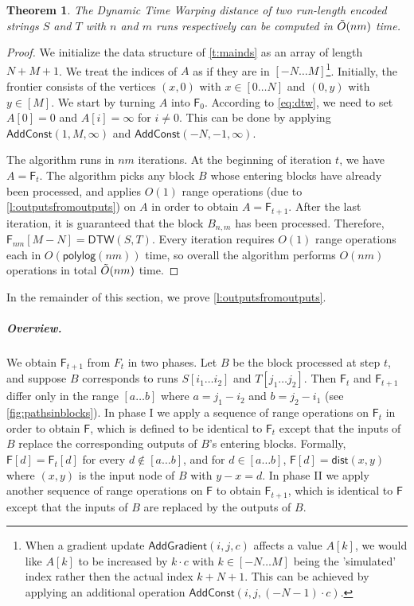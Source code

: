 \documentclass[10pt,a4paper]{article}
\newtheorem{theorem}{Theorem}[section]
\newcommand{\DTW}{\mathsf{DTW}}
\newcommand{\F}{\mathsf{F}}
\newcommand{\AC}{\mathsf{AddConst}}
\newcommand{\AG}{\mathsf{AddGradient}}
\newcommand{\dist}{\mathsf{dist}}
\newcommand{\para}[1]{\vspace{-0.1in} \subparagraph*{#1}}
\newcommand{\polylog}{\mathsf{polylog}}
\begin{document}
\begin{theorem}\label{t:maindtw}
The Dynamic Time Warping distance of two run-length encoded strings $S$ and $T$ with $n$ and $m$ runs respectively can be computed in $\Tilde{O}(nm)$ time.
\end{theorem}

\begin{proof}
We initialize the data structure of \cref{t:mainds} as an array of length $N+M+1$. 
We treat the indices of $A$ as if they are in $[-N \ldots M]$\footnote{When a gradient update $\AG(i,j,c)$ affects a value $A[k]$, we would like $A[k]$ to be increased by $k\cdot c$ with $k \in [-N \ldots M]$ being the 'simulated' index rather then the actual index $k+ N + 1$. This can be achieved by applying an additional operation $\AC(i,j, (-N-1) \cdot c)$.}.
Initially, the frontier consists of the vertices $(x,0)$ with $x\in [0 \ldots N]$ and $(0,y)$ with $y\in [M]$.
We start by turning $A$ into $\F_0$.
According to \cref{eq:dtw}, we need to set $A[0] = 0$ and $A[i] = \infty$ for $i\neq 0$.
This can be done by applying $\AC(1,M, \infty)$ and $\AC(-N,-1,\infty)$. 

The algorithm runs in $nm$ iterations.
At the beginning of iteration $t$, we have $A = \F_t$.
The algorithm picks any block $B$ whose entering blocks have already been processed, and applies $O(1)$ range operations (due to \cref{l:outputsfromoutputs}) on $A$ in order to obtain $A = \F_{t+1}$.
After the last iteration, it is guaranteed that the block $B_{n,m}$ has been processed. 
Therefore, $\F_{nm}[M-N]=\DTW(S,T)$.
Every iteration requires $O(1)$ range operations each in $O(\polylog(nm))$ time, so overall the algorithm performs $O(nm)$ operations in total $\Tilde{O}(nm)$ time.
\end{proof}



In the remainder of this section, we prove \cref{l:outputsfromoutputs}.        

\para{Overview.}
We obtain $\F_{t+1}$ from $F_{t}$ in two phases. Let $B$ be the block processed at step $t$, and suppose $B$ corresponds to runs $S[i_1\ldots i_2]$ and $T[j_1 \ldots j_2]$. Then $\F_t$ and $\F_{t+1}$ differ only in the range $[a\ldots b]$ where   $a= j_1-i_2$ and $b=j_2-i_1$ (see \cref{fig:pathsinblocks}).
In phase I we apply a sequence of range operations on $\F_{t}$ in order to obtain $\F$, which is defined to be identical to $\F_{t}$ except that the inputs of $B$ replace the corresponding outputs of $B$'s entering blocks.
 Formally,  
 $\F[d] = \F_t[d]$ for every $d \notin [a\ldots b]$, and for $d\in [a\ldots b]$, $\F[d] = \dist(x,y)$ where $(x,y)$ is the input node of $B$ with $y-x = d$. 
In phase II we apply another sequence of range operations on $\F$ to obtain $\F_{t+1}$, which is identical to $\F$ except that the inputs of $B$ are replaced by the outputs of $B$.  
\end{document}
